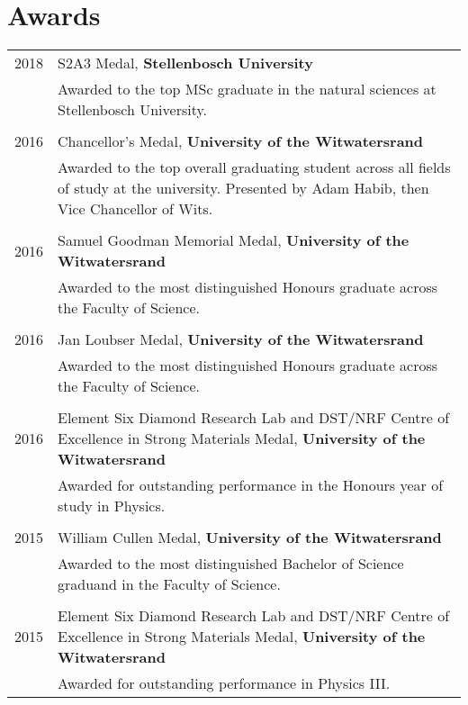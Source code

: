 \section{Awards}

\begin{supertabular}{rp{12cm}}
	2018 & S2A3 Medal, \textbf{Stellenbosch University} \\
	& \small{Awarded to the top MSc graduate in the natural sciences at Stellenbosch University.} \\
	& \\
	2016 & Chancellor's Medal, \textbf{University of the Witwatersrand} \\
	& \small{Awarded to the top overall graduating student across all fields of study at the university. Presented by Adam Habib, then Vice Chancellor of Wits.} \\
	& \\
	2016 & Samuel Goodman Memorial Medal, \textbf{University of the Witwatersrand} \\
	& \small{Awarded to the most distinguished Honours graduate across the Faculty of Science.} \\
	& \\
	2016 & Jan Loubser Medal, \textbf{University of the Witwatersrand} \\
	& \small{Awarded to the most distinguished Honours graduate across the Faculty of Science.} \\
	& \\
	2016 & Element Six Diamond Research Lab and DST/NRF Centre of Excellence in Strong Materials Medal, \textbf{University of the Witwatersrand} \\
	& \small{Awarded for outstanding performance in the Honours year of study in Physics.} \\
	& \\
	2015 & William Cullen Medal, \textbf{University of the Witwatersrand} \\
	& \small{Awarded to the most distinguished Bachelor of Science graduand in the Faculty of Science.} \\
	& \\
	2015 & Element Six Diamond Research Lab and DST/NRF Centre of Excellence in Strong Materials Medal, \textbf{University of the Witwatersrand} \\
	& \small{Awarded for outstanding performance in Physics III.} \\
\end{supertabular}